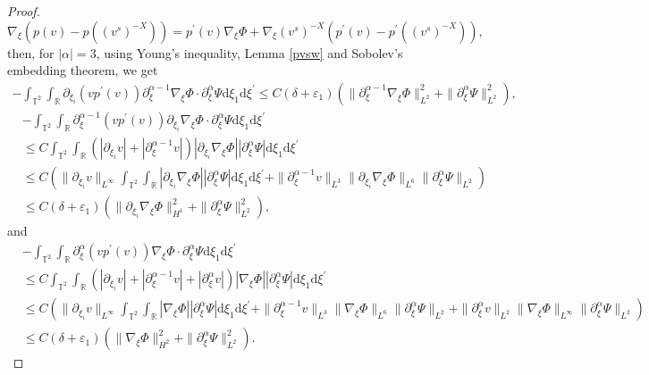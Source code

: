 \documentclass[10pt,reqno]{amsart}
\numberwithin{equation}{section}
\newcommand{\dif}{\mathrm{d}}
\begin{document}
\begin{proof}
\[
\nabla_\xi\left(p(v)-p((v^s)^{-X})\right)=p^\prime(v)\nabla_\xi\Phi+\nabla_\xi(v^s)^{-X}\left(p^\prime(v)-p^\prime((v^s)^{-X})\right),
\]
then, for $|\alpha|=3$, using Young's inequality, Lemma \ref{pvsw} and Sobolev's embedding theorem, we get
\begin{align*}
-\int_{\mathbb{T}^2}\int_{\mathbb{R}}\partial_{\xi_i}\left(vp^\prime(v)\right)\partial_\xi^{\alpha-1}\nabla_\xi\Phi
\cdot\partial_\xi^\alpha\Psi\dif \xi_1\dif \xi^{\prime}
\le C(\delta+\varepsilon_1)(\|\partial_\xi^{\alpha-1}\nabla_\xi\Phi\|_{L^2}^2+\|\partial_\xi^\alpha\Psi\|_{L^2}^2),
\end{align*}
\begin{align*}
&-\int_{\mathbb{T}^2}\int_{\mathbb{R}}\partial_\xi^{\alpha-1}\left(vp^\prime(v)\right)\partial_{\xi_i}\nabla_\xi\Phi
\cdot\partial_\xi^\alpha\Psi\dif \xi_1\dif \xi^{\prime}\\
&\le C\int_{\mathbb{T}^2}\int_{\mathbb{R}}\left(|\partial_{\xi_i}v|+|\partial_\xi^{\alpha-1}v|\right)|\partial_{\xi_i}\nabla_\xi\Phi|
|\partial_\xi^\alpha\Psi|\dif \xi_1\dif \xi^{\prime}\\
&\le C\left(\|\partial_{\xi_i}v\|_{L^\infty}\int_{\mathbb{T}^2}\int_{\mathbb{R}}|\partial_{\xi_i}\nabla_\xi\Phi|
|\partial_\xi^\alpha\Psi|\dif \xi_1\dif \xi^{\prime}+\|\partial_\xi^{\alpha-1}v\|_{L^3}\|\partial_{\xi_i}\nabla_\xi\Phi\|_{L^6}\|\partial_\xi^\alpha\Psi\|_{L^2}\right)\\
&\le C(\delta+\varepsilon_1)(\|\partial_{\xi_i}\nabla_\xi\Phi\|_{H^1}^2+\|\partial_\xi^\alpha\Psi\|_{L^2}^2),
\end{align*}
and
\begin{align*}
&-\int_{\mathbb{T}^2}\int_{\mathbb{R}}\partial_\xi^{\alpha}\left(vp^\prime(v)\right)\nabla_\xi\Phi
\cdot\partial_\xi^\alpha\Psi\dif \xi_1\dif \xi^{\prime}\\
&\le C\int_{\mathbb{T}^2}\int_{\mathbb{R}}\left(|\partial_{\xi_i}v|+|\partial_\xi^{\alpha-1}v|+|\partial_\xi^{\alpha}v|\right)|\nabla_\xi\Phi|
|\partial_\xi^\alpha\Psi|\dif \xi_1\dif \xi^{\prime}\\
&\le C\left(\|\partial_{\xi_i}v\|_{L^\infty}\int_{\mathbb{T}^2}\int_{\mathbb{R}}|\nabla_\xi\Phi|
|\partial_\xi^\alpha\Psi|\dif \xi_1\dif \xi^{\prime}+\|\partial_{\xi}^{\alpha-1}v\|_{L^3}\|\nabla_\xi\Phi\|_{L^6}\|\partial_\xi^\alpha\Psi\|_{L^2}
+\|\partial_{\xi}^{\alpha}v\|_{L^2}\|\nabla_\xi\Phi\|_{L^\infty}\|\partial_\xi^\alpha\Psi\|_{L^2}\right)\\
&\le C(\delta+\varepsilon_1)(\|\nabla_\xi\Phi\|_{H^2}^2+\|\partial_\xi^\alpha\Psi\|_{L^2}^2).

\end{align*}
\end{proof}
\end{document}
